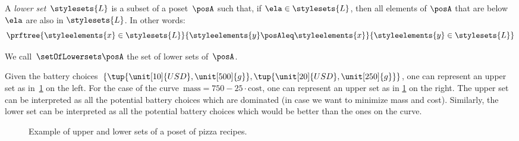 \begin{definition}
  \label{def:lowerset}
  A \emph{lower set}~$\stylesets{L}$ is a subset of a poset~$\posA$ such that, if $\ela \in \stylesets{L}$, then all elements of $\posA$ that are below $\ela$ are also in $\stylesets{L}$.
  In other words:
  \begin{equation}
    \prftree{\styleelements{x}\in \stylesets{L}}{\styleelements{y}\posAleq \styleelements{x}}{\styleelements{y}\in \stylesets{L}}
  \end{equation}
\end{definition}
We call~$\setOfLowersets \posA$ the set of lower sets of~$\posA$.
%

Given the battery choices~$\{\tup{\unit[10]{USD},\unit[500]{g}},\tup{\unit[20]{USD},\unit[250]{g}}\}$, one can represent an upper set as in~\cref{fig:upperset} on the left.
For the case of the curve~$\text{mass}=750-25\cdot \text{cost}$, one can represent an upper set as in \cref{fig:upperset} on the right.
The upper set can be interpreted as all the potential battery choices which are dominated (in case we want to minimize mass and cost).
Similarly, the lower set can be interpreted as all the potential battery choices which would be better than the ones on the curve.

\begin{figure}[h!]
  \begin{center}
  \end{center}
  \caption{Example of upper and lower sets of a poset of pizza recipes.}
  \label{fig:upperset}
\end{figure}

%
